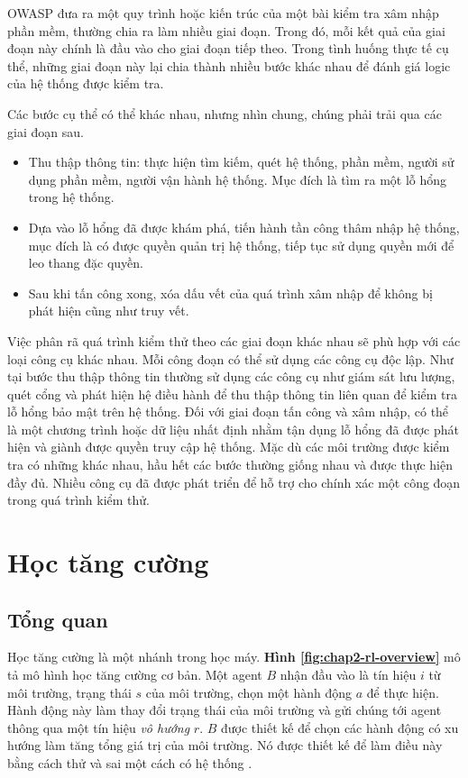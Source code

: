 OWASP đưa ra một quy trình hoặc kiến trúc của một bài kiểm tra xâm nhập phần mềm, thường chia ra làm nhiều giai đoạn. Trong đó, mỗi kết quả của giai đoạn này chính là đầu vào cho giai đoạn tiếp theo. Trong tình huống thực tế cụ thể, những giai đoạn này lại chia thành nhiều bước khác nhau để đánh giá logic của hệ thống được kiểm tra.

Các bước cụ thể có thể khác nhau, nhưng nhìn chung, chúng phải trải qua các giai đoạn sau.
\begin{itemize}
    \item Thu thập thông tin: thực hiện tìm kiếm, quét hệ thống, phần mềm, người sử dụng phần mềm, người vận hành hệ thống. Mục đích là tìm ra một lỗ hổng trong hệ thống.
    \item Dựa vào lỗ hổng đã được khám phá, tiến hành tần công thâm nhập hệ thống, mục đích là có được quyền quản trị hệ thống, tiếp tục sử dụng quyền mới để leo thang đặc quyền.
    \item Sau khi tấn công xong, xóa dấu vết của quá trình xâm nhập để không bị phát hiện cũng như truy vết.
\end{itemize}

Việc phân rã quá trình kiểm thử theo các giai đoạn khác nhau sẽ phù hợp với các loại công cụ khác nhau. Mỗi công đoạn có thể sử dụng các công cụ độc lập. Như tại bước thu thập thông tin thường sử dụng các công cụ như giám sát lưu lượng, quét cổng và phát hiện hệ điều hành để thu thập thông tin liên quan để kiểm tra lỗ hổng bảo mật trên hệ thống. Đối với giai đoạn tấn công và xâm nhập, có thể là một chương trình hoặc dữ liệu nhất định nhằm tận dụng lỗ hổng đã được phát hiện và giành được quyền truy cập hệ thống. Mặc dù các môi trường được kiểm tra có những khác nhau, hầu hết các bước thường giống nhau và được thực hiện đầy đủ. Nhiều công cụ đã được phát triển để hỗ trợ cho chính xác một công đoạn trong quá trình kiểm thử.

\section{Học tăng cường}
\subsection{Tổng quan}



Học tăng cường là một nhánh trong học máy. \textbf{Hình \ref{fig:chap2-rl-overview}} mô tả mô hình học tăng cường cơ bản. Một agent $B$ nhận đầu vào là tín hiệu $i$ từ môi trường, trạng thái $s$ của môi trường, chọn một hành động $a$ để thực hiện. Hành động này làm thay đổi trạng thái của môi trường và gửi chúng tới agent thông qua một tín hiệu \textit{vô hướng} $r$. $B$ được thiết kế để chọn các hành động có xu hướng làm tăng tổng giá trị của môi trường. Nó được thiết kế để làm điều này bằng cách thử và sai một cách có hệ thống \cite{kaelbling1996reinforcement}. 


